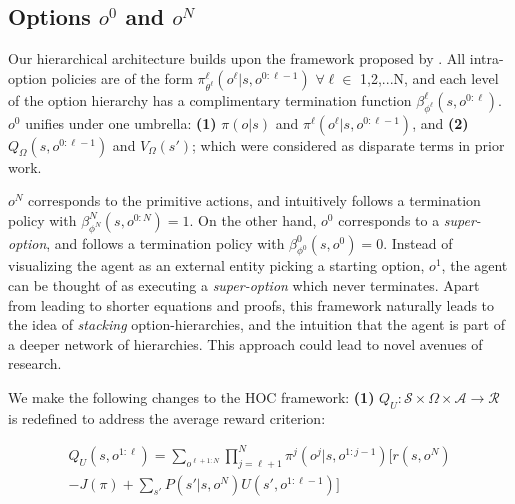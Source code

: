 \documentclass[letterpaper]{article} %
\begin{document}
\subsection{Options $o^{0}$ and $o^{N}$}
Our hierarchical architecture builds upon the framework proposed by \cite{hoc}. All intra-option policies are of the form $\pi_{\theta^\ell}^\ell(o^{\ell}|s,o^{0:\ell-1})$ $\forall \ell \in$ {1,2,...N}, and each level of the option hierarchy has a complimentary termination function $\beta_{\phi^{\ell}}^{\ell}(s,o^{0:\ell})$. $o^{0}$ unifies under one umbrella: \textbf{(1)} $\pi(o|s)$ and $\pi^{\ell}(o^{\ell}|s,o^{0:\ell-1})$, and \textbf{(2)} $Q_\Omega(s,o^{0:\ell-1})$ and $V_\Omega(s')$; which were considered as disparate terms in prior work. 

$o^N$ corresponds to the primitive actions, and intuitively follows a termination policy with $\beta_{\phi^{N}}^{N}(s,o^{0:N})=1$. On the other hand, $o^0$ corresponds to a \textit{super-option}, and follows a termination policy with $\beta_{\phi^{0}}^{0}(s,o^{0})=0$. Instead of visualizing the agent as an external entity picking a starting option, $o^{1}$, the agent can be thought of as executing a \textit{super-option} which never terminates. Apart from leading to shorter equations and proofs, this framework naturally leads to the idea of \textit{stacking} option-hierarchies, and the intuition that the agent is part of a deeper network of hierarchies. This approach could lead to novel avenues of research.

We make the following changes to the HOC framework:
\textbf{(1)} $Q_U: \mathcal{S} \times \Omega \times \mathcal{A} \rightarrow \mathcal{R}$ is redefined to address the average reward criterion:

\vspace{-5mm}
\begin{equation}\label{eq:QU}
\begin{aligned}
Q_U(s,o^{1:\ell}) = \sum_{o^{\ell+1:N}}\prod_{j=\ell+1}^{N}\pi^{j}(o^{j}|s,o^{1:j-1})\Bigg[r(s,o^{N}) \\
- J(\pi) + \sum_{s'} P(s'|s,o^{N})U(s',o^{1:\ell-1})\Bigg]
\end{aligned}
\end{equation}
\vspace{-4mm}
\end{document}
